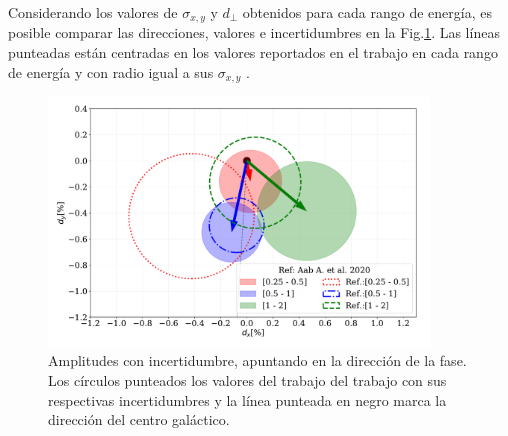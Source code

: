Considerando los valores de $\sigma_{x,y}$ y $d_\perp$ obtenidos para cada rango de energía, es posible  comparar las direcciones, valores e incertidumbres en la Fig.\ref{fig:incertidumbre}. Las líneas punteadas están centradas en los valores reportados en el trabajo \cite{Aab_2020} en cada rango de energía y con radio igual a sus $\sigma_{x,y}$ . 

\begin{figure}[H]
    \begin{small}
        \begin{center}
            \includegraphics[width=0.9\textwidth]{comparando_sigmas_v3.pdf}
        \end{center}
        \caption{Amplitudes con incertidumbre, apuntando en la dirección  de la fase. Los círculos punteados los valores del trabajo \cite{Aab_2020}del trabajo \cite{Aab_2020} con sus respectivas incertidumbres y la línea punteada en negro marca la dirección del centro galáctico.}
        \label{fig:incertidumbre}
    \end{small}
\end{figure}

